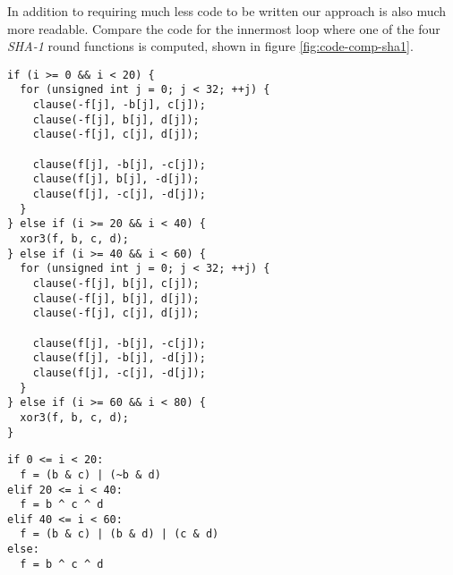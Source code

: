 In addition to requiring much less code to be written our approach is also much more readable.
Compare the code for the innermost loop where one of the four \emph{SHA-1} round functions is computed, shown in figure \ref{fig:code-comp-sha1}.

\newsavebox{\mintedboxleft}
\newsavebox{\mintedboxright}
\begin{sidewaysfigure}
\begin{lrbox}{\mintedboxleft}
\begin{minipage}[c]{.4\textwidth}
\vspace{.5cm}%
\begin{verbatim}
if (i >= 0 && i < 20) {
  for (unsigned int j = 0; j < 32; ++j) {
    clause(-f[j], -b[j], c[j]);
    clause(-f[j], b[j], d[j]);
    clause(-f[j], c[j], d[j]);

    clause(f[j], -b[j], -c[j]);
    clause(f[j], b[j], -d[j]);
    clause(f[j], -c[j], -d[j]);
  }
} else if (i >= 20 && i < 40) {
  xor3(f, b, c, d);
} else if (i >= 40 && i < 60) {
  for (unsigned int j = 0; j < 32; ++j) {
    clause(-f[j], b[j], c[j]);
    clause(-f[j], b[j], d[j]);
    clause(-f[j], c[j], d[j]);

    clause(f[j], -b[j], -c[j]);
    clause(f[j], -b[j], -d[j]);
    clause(f[j], -c[j], -d[j]);
  }
} else if (i >= 60 && i < 80) {
  xor3(f, b, c, d);
}
\end{verbatim}
\end{minipage}
\end{lrbox}
\begin{lrbox}{\mintedboxright}
\begin{minipage}[c]{.35\textwidth}
\vspace{.5cm}%
\begin{verbatim}
if 0 <= i < 20:
  f = (b & c) | (~b & d)
elif 20 <= i < 40:
  f = b ^ c ^ d
elif 40 <= i < 60:
  f = (b & c) | (b & d) | (c & d)
else:
  f = b ^ c ^ d
\end{verbatim}
\end{minipage}
\end{lrbox}
\centering
{}
\hspace{2cm}
\caption{Comparison of code for computing the \emph{SHA-1} round functions.}
\label{fig:code-comp-sha1}
\end{sidewaysfigure}

